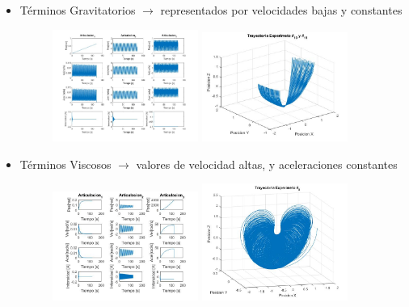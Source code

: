 \newpage
\begin{itemize}
	\item Términos Gravitatorios $ \rightarrow $ representados por velocidades bajas y constantes

	\begin{figure}[h!]
		\centering
		\includegraphics[width=0.45\textwidth]{graftheta10y11}
		\includegraphics[width=0.45\textwidth]{Traytheta10y11}
	\end{figure}

	\item Términos Viscosos $ \rightarrow $ valores de velocidad altas, y aceleraciones constantes

	\begin{figure}[h!]
		\centering
		\includegraphics[width=0.45\textwidth]{graftheta9}
		\includegraphics[width=0.45\textwidth]{Traytheta9}
	\end{figure}



\end{itemize}
